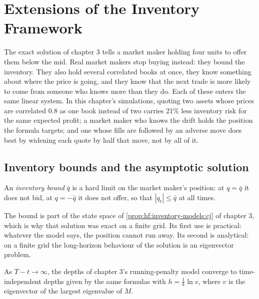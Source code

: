 \chapter{Extensions of the Inventory Framework}\label{ch:hf:extensions-of-the-inventory-framework}

The exact solution of chapter 3 tells a market maker holding four units to offer them below the mid. Real market makers stop buying instead:
they bound the inventory. They also hold several correlated books at once, they know something about where the price is going, and they know
that the next trade is more likely to come from someone who knows more than they do. Each of these enters the same linear system. In this
chapter's simulations, quoting two assets whose prices are correlated 0.8 as one book instead of two carries 21\% less inventory risk for the same
expected profit; a market maker who knows the drift holds the position the formula targets; and one whose fills are followed by an adverse move
does best by widening each quote by half that move, not by all of it.

\section{Inventory bounds and the asymptotic solution}

\begin{definition}\label{def:hf:extensions-of-the-inventory-framework:bound}
An \emph{inventory bound} $\bar q$ is a hard limit on the market maker's position: at $q=\bar q$ it does not bid, at
$q=-\bar q$ it does not offer, so that $|q_t|\le\bar q$ at all times.
\end{definition}

The bound is part of the state space of \cref{prop:hf:inventory-models:cj} of chapter 3, which is why that solution was exact on a finite grid. Its
first use is practical: whatever the model says, the position cannot run away. Its second is analytical: on a finite grid the long-horizon
behaviour of the solution is an eigenvector problem.

\begin{proposition}\label{prop:hf:extensions-of-the-inventory-framework:stationary}
As $T-t\to\infty$, the depths of chapter 3's running-penalty model converge to time-independent depths given by the same formulas with
$h=\tfrac1k\ln v$, where $v$ is the eigenvector of the largest eigenvalue of $M$.
\end{proposition}

